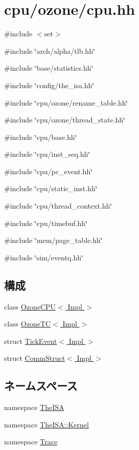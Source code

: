 \hypertarget{ozone_2cpu_8hh}{
\section{cpu/ozone/cpu.hh}
\label{ozone_2cpu_8hh}
}
{\ttfamily \#include $<$set$>$}\par
{\ttfamily \#include \char`\"{}arch/alpha/tlb.hh\char`\"{}}\par
{\ttfamily \#include \char`\"{}base/statistics.hh\char`\"{}}\par
{\ttfamily \#include \char`\"{}config/the\_\-isa.hh\char`\"{}}\par
{\ttfamily \#include \char`\"{}cpu/ozone/rename\_\-table.hh\char`\"{}}\par
{\ttfamily \#include \char`\"{}cpu/ozone/thread\_\-state.hh\char`\"{}}\par
{\ttfamily \#include \char`\"{}cpu/base.hh\char`\"{}}\par
{\ttfamily \#include \char`\"{}cpu/inst\_\-seq.hh\char`\"{}}\par
{\ttfamily \#include \char`\"{}cpu/pc\_\-event.hh\char`\"{}}\par
{\ttfamily \#include \char`\"{}cpu/static\_\-inst.hh\char`\"{}}\par
{\ttfamily \#include \char`\"{}cpu/thread\_\-context.hh\char`\"{}}\par
{\ttfamily \#include \char`\"{}cpu/timebuf.hh\char`\"{}}\par
{\ttfamily \#include \char`\"{}mem/page\_\-table.hh\char`\"{}}\par
{\ttfamily \#include \char`\"{}sim/eventq.hh\char`\"{}}\par
\subsection*{構成}
\begin{DoxyCompactItemize}
\item 
class \hyperlink{classOzoneCPU}{OzoneCPU$<$ Impl $>$}
\item 
class \hyperlink{classOzoneCPU_1_1OzoneTC}{OzoneTC$<$ Impl $>$}
\item 
struct \hyperlink{structOzoneCPU_1_1TickEvent}{TickEvent$<$ Impl $>$}
\item 
struct \hyperlink{structOzoneCPU_1_1CommStruct}{CommStruct$<$ Impl $>$}
\end{DoxyCompactItemize}
\subsection*{ネームスペース}
\begin{DoxyCompactItemize}
\item 
namespace \hyperlink{namespaceTheISA}{TheISA}
\item 
namespace \hyperlink{namespaceTheISA_1_1Kernel}{TheISA::Kernel}
\item 
namespace \hyperlink{namespaceTrace}{Trace}
\end{DoxyCompactItemize}
